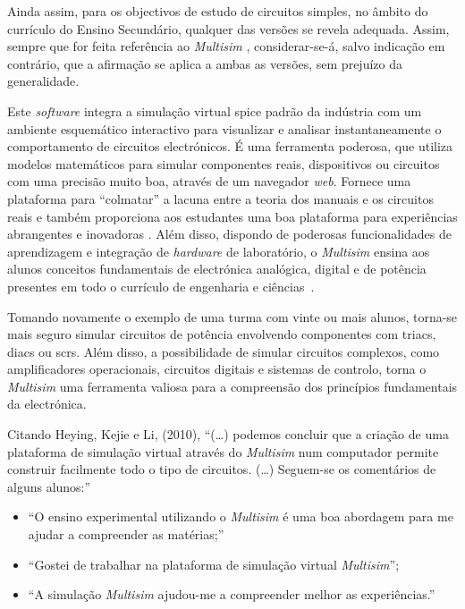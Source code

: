 Ainda assim, para os objectivos de estudo de circuitos simples, no âmbito do currículo do Ensino Secundário, qualquer das versões se revela adequada. Assim, sempre que for feita referência ao \textit{Multisim} \cite{multisim}, considerar-se-á, salvo indicação em contrário, que a afirmação se aplica a ambas as versões, sem prejuízo da generalidade.

Este \textit{software} integra a simulação virtual \acrfull{spice} padrão da indústria com um ambiente esquemático interactivo para visualizar e analisar instantaneamente o comportamento de circuitos electrónicos. É uma ferramenta poderosa, que utiliza modelos matemáticos para simular componentes reais, dispositivos ou circuitos com uma precisão muito boa, através de um navegador \textit{web}. Fornece uma plataforma para ``colmatar'' a lacuna entre a teoria dos manuais e os circuitos reais e também proporciona aos estudantes uma boa plataforma para experiências abrangentes e inovadoras \cite{multisim}. Além disso, dispondo de poderosas funcionalidades de aprendizagem e integração de \textit{hardware} de laboratório, o \textit{Multisim} ensina aos alunos conceitos fundamentais de electrónica analógica, digital e de potência presentes em todo o currículo de engenharia e ciências~\cite{ImportantSimSoftware}.

Tomando novamente o exemplo de uma turma com vinte ou mais alunos, torna-se mais seguro simular circuitos de potência envolvendo componentes com \gls{triac}s, \gls{diac}s ou \gls{scr}s. Além disso, a possibilidade de simular circuitos complexos, como amplificadores operacionais, circuitos digitais e sistemas de controlo, torna o \textit{Multisim} uma ferramenta valiosa para a compreensão dos princípios fundamentais da electrónica.

Citando Heying, Kejie e Li, (2010), ``(\ldots) podemos concluir que a criação de uma plataforma de simulação virtual através do \textit{Multisim} num computador permite construir facilmente todo o tipo de circuitos. (\ldots) Seguem-se os comentários de alguns alunos:''
\begin{itemize}
    \item ``O ensino experimental utilizando o \textit{Multisim} é uma boa abordagem para me ajudar a compreender as matérias;''
    \item ``Gostei de trabalhar na plataforma de simulação virtual \textit{Multisim}'';
    \item ``A simulação \textit{Multisim} ajudou-me a compreender melhor as experiências.''
\end{itemize}

